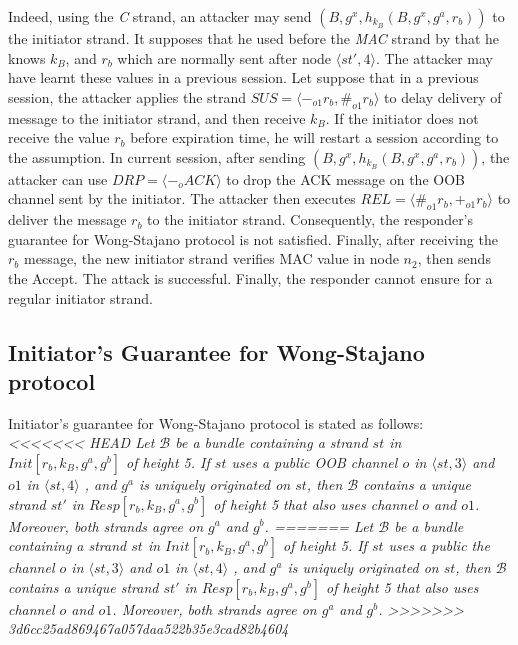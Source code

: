 \begin{itemize}
Indeed, using the \textit{C} strand, an attacker may send $(B, g^{x}, h_{k_B}(B,g^{x},g^a,r_b))$ to the initiator strand. 
It supposes that he used before the \textit{MAC} strand by that he knows $k_B$, and $r_b$ which are normally sent after node $\langle st',4 \rangle$. The attacker may have learnt these values in a previous session. Let suppose that in a previous session, the attacker applies the strand $SUS = \langle -_{o1} r_b,\#_{o1} r_b \rangle$ to delay delivery of message to the initiator strand, and then receive $k_B$. If the initiator does not receive the value $r_b$ before expiration time, he will restart a session according to the assumption. In current session, after sending $(B, g^{x}, h_{k_B}(B,g^{x},g^a,r_b))$, the attacker can use $DRP = \langle -_o ACK \rangle$ to drop the ACK message on the OOB channel sent by the initiator. The attacker then executes $REL= \langle \#_{o1} r_b,+_{o1} r_b \rangle$ to deliver the message $r_b$ to the initiator strand. Consequently, the responder's guarantee for Wong-Stajano protocol is not satisfied. Finally, after receiving the $r_b$ message, the new initiator strand verifies MAC value in node $n_2$, then sends the Accept. The attack is successful. Finally, the responder cannot ensure for a regular initiator strand. 


\subsection{Initiator's Guarantee for Wong-Stajano protocol}

Initiator's guarantee for Wong-Stajano protocol is stated as follows:\\
\textit{
<<<<<<< HEAD
Let $\mathcal{B}$ be a bundle containing a strand $st$ in $Init[r_b, k_B,g^a,g^b]$ of height 5. If $st$ uses a public OOB channel $o$ in $\langle st,3 \rangle$ and $o1$ in $\langle st,4 \rangle$ , and $g^a$ is uniquely originated on $st$, then $\mathcal{B}$ contains a unique strand $st'$ in $Resp[r_b, k_B,g^a,g^b]$ of height 5 that also uses channel $o$ and $o1$. Moreover, both strands agree on $g^a$ and $g^b$.
=======
Let $\mathcal{B}$ be a bundle containing a strand $st$ in $Init[r_b, k_B,g^a,g^b]$ of height 5. If $st$ uses a public the channel $o$ in $\langle st,3 \rangle$ and $o1$ in $\langle st,4 \rangle$ , and $g^a$ is uniquely originated on $st$, then $\mathcal{B}$ contains a unique strand $st'$ in $Resp[r_b, k_B,g^a,g^b]$ of height 5 that also uses channel $o$ and $o1$. Moreover, both strands agree on $g^a$ and $g^b$.
>>>>>>> 3d6cc25ad869467a057daa522b35e3cad82b4604
}


\end{itemize}
